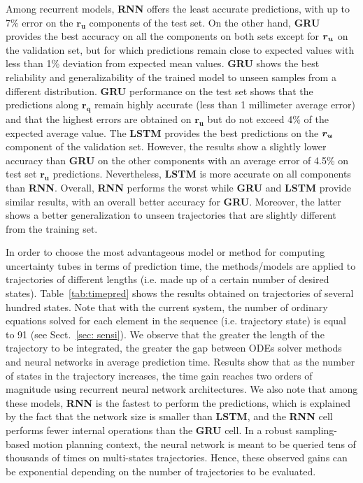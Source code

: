 Among recurrent models, \textbf{RNN} offers the least accurate predictions, with up to 7\% error on the $\boldsymbol{r_u}$ components of the test set.
On the other hand, \textbf{GRU} provides the best accuracy on all the components on both sets except for $\boldsymbol{r_u}$ on the validation set, but for which predictions remain close to expected values with less than 1\% deviation from expected mean values.
\textbf{GRU} shows the best reliability and generalizability of the trained model to unseen samples from a different distribution.
\textbf{GRU} performance on the test set shows that the predictions along $\boldsymbol{r_q}$ remain highly accurate (less than 1 millimeter average error) and that the highest errors are obtained on $\boldsymbol{r_u}$ but do not exceed 4\% of the expected average value.
The \textbf{LSTM} provides the best predictions on the $\boldsymbol{r_u}$ component of the validation set. 
However, the results show a slightly lower accuracy than \textbf{GRU} on the other components with an average error of 4.5\% on test set $\boldsymbol{r_u}$ predictions.
Nevertheless, \textbf{LSTM} is more accurate on all components than \textbf{RNN}.
Overall, \textbf{RNN} performs the worst while \textbf{GRU} and \textbf{LSTM} provide similar results, with an overall better accuracy for \textbf{GRU}.
Moreover, the latter shows a better generalization to unseen trajectories that are slightly different from the training set.

In order to choose the most advantageous model or method for computing uncertainty tubes in terms of prediction time, the methods/models are applied to trajectories of different lengths (i.e. made up of a certain number of desired states). 
Table~\ref{tab:timepred} shows the results obtained on trajectories of several hundred states. 
Note that with the current system, the number of ordinary equations solved for each element in the sequence (i.e. trajectory state) is equal to 91 (see Sect.~\ref{sec: sensi}).
We observe that the greater the length of the trajectory to be integrated, the greater the gap between ODEs solver methods and neural networks in average prediction time.
Results show that as the number of states in the trajectory increases, the time gain reaches two orders of magnitude using recurrent neural network architectures.
We also note that among these models, \textbf{RNN} is the fastest to perform the predictions, which is explained by the fact that the network size is smaller than \textbf{LSTM}, and the \textbf{RNN} cell performs fewer internal operations than the \textbf{GRU} cell.
In a robust sampling-based motion planning context, the neural network is meant to be queried tens of thousands of times on multi-states trajectories.
Hence, these observed gains can be exponential depending on the number of trajectories to be evaluated.

